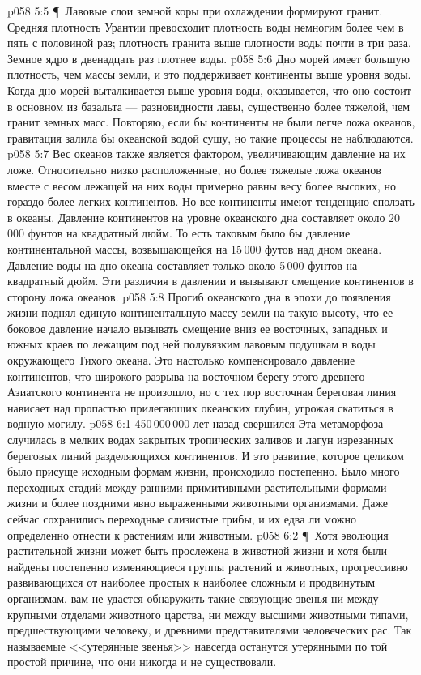 \vs p058 5:5 \P\ Лавовые слои земной коры при охлаждении формируют гранит. Средняя плотность Урантии превосходит плотность воды немногим более чем в пять с половиной раз; плотность гранита выше плотности воды почти в три раза. Земное ядро в двенадцать раз плотнее воды.
\vs p058 5:6 Дно морей имеет большую плотность, чем массы земли, и это поддерживает континенты выше уровня воды. Когда дно морей выталкивается выше уровня воды, оказывается, что оно состоит в основном из базальта --- разновидности лавы, существенно более тяжелой, чем гранит земных масс. Повторяю, если бы континенты не были легче ложа океанов, гравитация залила бы океанской водой сушу, но такие процессы не наблюдаются.
\vs p058 5:7 Вес океанов также является фактором, увеличивающим давление на их ложе. Относительно низко расположенные, но более тяжелые ложа океанов вместе с весом лежащей на них воды примерно равны весу более высоких, но гораздо более легких континентов. Но все континенты имеют тенденцию сползать в океаны. Давление континентов на уровне океанского дна составляет около 20\,000 фунтов на квадратный дюйм. То есть таковым было бы давление континентальной массы, возвышающейся на 15\,000 футов над дном океана. Давление воды на дно океана составляет только около 5\,000 фунтов на квадратный дюйм. Эти различия в давлении и вызывают смещение континентов в сторону ложа океанов.
\vs p058 5:8 Прогиб океанского дна в эпохи до появления жизни поднял единую континентальную массу земли на такую высоту, что ее боковое давление начало вызывать смещение вниз ее восточных, западных и южных краев по лежащим под ней полувязким лавовым подушкам в воды окружающего Тихого океана. Это настолько компенсировало давление континентов, что широкого разрыва на восточном берегу этого древнего Азиатского континента не произошло, но с тех пор восточная береговая линия нависает над пропастью прилегающих океанских глубин, угрожая скатиться в водную могилу.
\vs p058 6:1 450\,000\,000 лет назад свершился  Эта метаморфоза случилась в мелких водах закрытых тропических заливов и лагун изрезанных береговых линий разделяющихся континентов. И это развитие, которое целиком было присуще исходным формам жизни, происходило постепенно. Было много переходных стадий между ранними примитивными растительными формами жизни и более поздними явно выраженными животными организмами. Даже сейчас сохранились переходные слизистые грибы, и их едва ли можно определенно отнести к растениям или животным.
\vs p058 6:2 \P\ Хотя эволюция растительной жизни может быть прослежена в животной жизни и хотя были найдены постепенно изменяющиеся группы растений и животных, прогрессивно развивающихся от наиболее простых к наиболее сложным и продвинутым организмам, вам не удастся обнаружить такие связующие звенья ни между крупными отделами животного царства, ни между высшими животными типами, предшествующими человеку, и древними представителями человеческих рас. Так называемые <<утерянные звенья>> навсегда останутся утерянными по той простой причине, что они никогда и не существовали.
